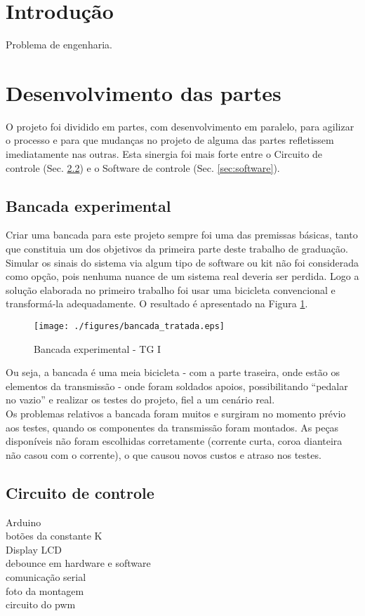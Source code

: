 \documentclass[a4paper,11pt]{article}
\begin{document}
\pagebreak
%
\section{Introdução}
\label{sec:intro}
Problema de engenharia.

\pagebreak
%
\section{Desenvolvimento das partes}
\label{sec:partes}
O projeto foi dividido em partes, com desenvolvimento em paralelo, para agilizar o processo e para que mudanças no projeto de alguma das partes refletissem imediatamente nas outras. Esta sinergia foi mais forte entre o Circuito de controle (Sec. \ref{sec:arduino}) e o Software de controle (Sec. \ref{sec:software}).

\subsection{Bancada experimental}
\label{sec:bancada}
Criar uma bancada para este projeto sempre foi uma das premissas básicas, tanto que constituia um dos objetivos da primeira parte deste trabalho de graduação. Simular os sinais do sistema via algum tipo de software ou kit não foi considerada como opção, pois nenhuma nuance de um sistema real deveria ser perdida. Logo a solução elaborada no primeiro trabalho foi usar uma bicicleta convencional e transformá-la adequadamente. O resultado é apresentado na Figura \ref{fig:bancada}.
\begin{figure}[!h]
 \begin{center}
  \texttt{[image: ./figures/bancada\_tratada.eps]}
 \end{center}
 \caption{Bancada experimental - TG I}
 \label{fig:bancada}
\end{figure}
Ou seja, a bancada é uma meia bicicleta - com a parte traseira, onde estão os elementos da transmissão - onde foram soldados apoios, possibilitando ``pedalar no vazio'' e realizar os testes do projeto, fiel a um cenário real. \\
Os problemas relativos a bancada foram muitos e surgiram no momento prévio aos testes, quando os componentes da transmissão foram montados. As peças disponíveis não foram escolhidas corretamente (corrente curta, coroa dianteira não casou com o corrente), o que causou novos custos e atraso nos testes.

%
\subsection{Circuito de controle}
\label{sec:arduino}
Arduino\\
botões da constante K \\
Display LCD \\
debounce em hardware e software \\
comunicação serial \\
foto da montagem \\
circuito do pwm \\
\end{document}
